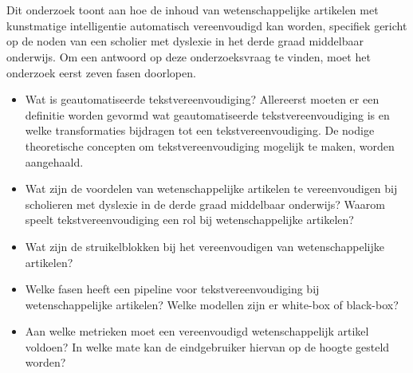 \section{}%
\label{sec:onderzoeksvraag}


Dit onderzoek toont aan hoe de inhoud van wetenschappelijke artikelen met kunstmatige intelligentie automatisch vereenvoudigd kan worden, specifiek gericht op de noden van een scholier met dyslexie in het derde graad middelbaar onderwijs. Om een antwoord op deze onderzoeksvraag te vinden, moet het onderzoek eerst zeven fasen doorlopen.

\begin{itemize}
	\item Wat is geautomatiseerde tekstvereenvoudiging? Allereerst moeten er een definitie worden gevormd wat geautomatiseerde tekstvereenvoudiging is en welke transformaties bijdragen tot een tekstvereenvoudiging. De nodige theoretische concepten om tekstvereenvoudiging mogelijk te maken, worden aangehaald. 
	\item Wat zijn de voordelen van wetenschappelijke artikelen te vereenvoudigen bij scholieren met dyslexie in de derde graad middelbaar onderwijs? Waarom speelt tekstvereenvoudiging een rol bij wetenschappelijke artikelen?
	\item Wat zijn de struikelblokken bij het vereenvoudigen van wetenschappelijke artikelen?
	\item Welke fasen heeft een pipeline voor tekstvereenvoudiging bij wetenschappelijke artikelen? Welke modellen zijn er white-box of black-box?
	\item Aan welke metrieken moet een vereenvoudigd wetenschappelijk artikel voldoen? In welke mate kan de eindgebruiker hiervan op de hoogte gesteld worden? 
\end{itemize}


\section{}%
\label{sec:onderzoeksdoelstelling}

